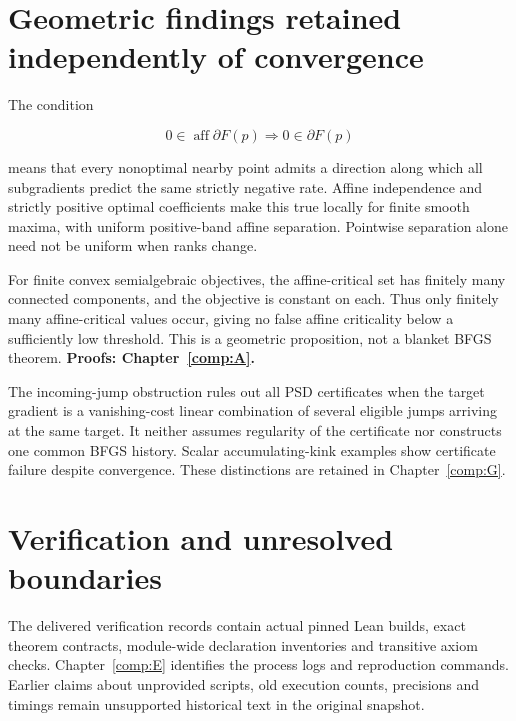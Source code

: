 

\section{Geometric findings retained independently of convergence}\label{geometric-findings-retained-independently-of-convergence}

The condition

\[0\in\operatorname{aff}\partial F(p)\Longrightarrow0\in\partial F(p)\]

means that every nonoptimal nearby point admits a direction along which all subgradients predict the same strictly negative rate. Affine independence and strictly positive optimal coefficients make this true locally for finite smooth maxima, with uniform positive-band affine separation. Pointwise separation alone need not be uniform when ranks change.

For finite convex semialgebraic objectives, the affine-critical set has finitely many connected components, and the objective is constant on each. Thus only finitely many affine-critical values occur, giving no false affine criticality below a sufficiently low threshold. This is a geometric proposition, not a blanket BFGS theorem. \textbf{Proofs: Chapter~\ref{comp:A}.}

The incoming-jump obstruction rules out all PSD certificates when the target gradient is a vanishing-cost linear combination of several eligible jumps arriving at the same target. It neither assumes regularity of the certificate nor constructs one common BFGS history. Scalar accumulating-kink examples show certificate failure despite convergence. These distinctions are retained in Chapter~\ref{comp:G}.



\section{Verification and unresolved boundaries}\label{verification-and-unresolved-boundaries}

The delivered verification records contain actual pinned Lean builds, exact theorem contracts, module-wide declaration inventories and transitive axiom checks. Chapter~\ref{comp:E} identifies the process logs and reproduction commands. Earlier claims about unprovided scripts, old execution counts, precisions and timings remain unsupported historical text in the original snapshot.

